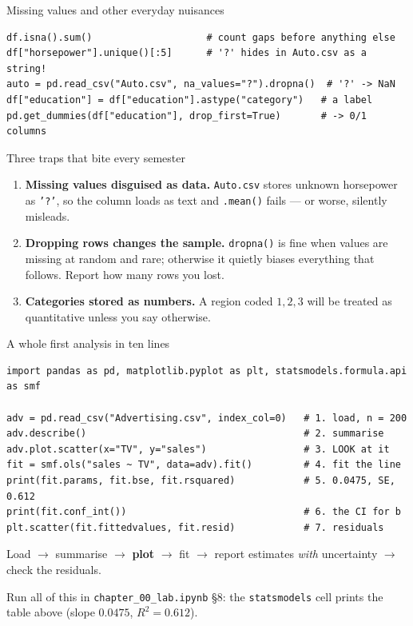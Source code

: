 \documentclass[aspectratio=169,11pt]{beamer}
\begin{document}
\begin{frame}[fragile]{Missing values and other everyday nuisances}
\begin{lstlisting}
df.isna().sum()                    # count gaps before anything else
df["horsepower"].unique()[:5]      # '?' hides in Auto.csv as a string!
auto = pd.read_csv("Auto.csv", na_values="?").dropna()  # '?' -> NaN
df["education"] = df["education"].astype("category")   # a label
pd.get_dummies(df["education"], drop_first=True)       # -> 0/1 columns
\end{lstlisting}
  \begin{alertblock}{Three traps that bite every semester}
    \begin{enumerate}
      \item \textbf{Missing values disguised as data.} \texttt{Auto.csv}
            stores unknown horsepower as \texttt{'?'}, so the column loads as
            text and \texttt{.mean()} fails --- or worse, silently misleads.
      \item \textbf{Dropping rows changes the sample.} \texttt{dropna()} is
            fine when values are missing at random and rare; otherwise it
            quietly biases everything that follows. Report how many rows you
            lost.
      \item \textbf{Categories stored as numbers.} A region coded $1,2,3$ will
            be treated as quantitative unless you say otherwise.
    \end{enumerate}
  \end{alertblock}
\end{frame}

\begin{frame}[fragile]{A whole first analysis in ten lines}
\begin{lstlisting}
import pandas as pd, matplotlib.pyplot as plt, statsmodels.formula.api as smf

adv = pd.read_csv("Advertising.csv", index_col=0)   # 1. load, n = 200
adv.describe()                                      # 2. summarise
adv.plot.scatter(x="TV", y="sales")                 # 3. LOOK at it
fit = smf.ols("sales ~ TV", data=adv).fit()         # 4. fit the line
print(fit.params, fit.bse, fit.rsquared)            # 5. 0.0475, SE, 0.612
print(fit.conf_int())                               # 6. the CI for b
plt.scatter(fit.fittedvalues, fit.resid)            # 7. residuals
\end{lstlisting}
  \vspace{-4pt}
  \begin{takeaway}
    Load $\to$ summarise $\to$ \textbf{plot} $\to$ fit $\to$ report estimates
    \emph{with} uncertainty $\to$ check the residuals.
  \end{takeaway}
  \begin{labnote}
    Run all of this in \texttt{chapter\_00\_lab.ipynb} \S8: the \texttt{statsmodels}
    cell prints the table above (slope $0.0475$, $R^2 = 0.612$).
  \end{labnote}
\end{frame}
\end{document}
